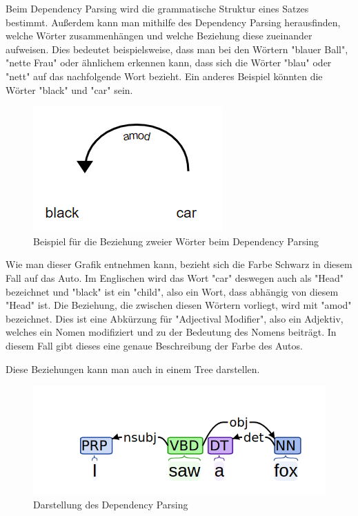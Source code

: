 Beim Dependency Parsing wird die grammatische Struktur eines Satzes bestimmt.
Außerdem kann man mithilfe des Dependency Parsing herausfinden, welche Wörter zusammenhängen und welche Beziehung diese zueinander aufweisen.
Dies bedeutet beispielsweise, dass man bei den Wörtern "blauer Ball", "nette Frau" oder ähnlichem erkennen kann, dass sich die Wörter "blau" oder "nett" auf das nachfolgende Wort bezieht.
Ein anderes Beispiel könnten die Wörter "black" und "car" sein.

\begin{figure}[hbt!]
    \centering
    \includegraphics[scale=1]{pics/dependency_parsing}
    \caption{Beispiel für die Beziehung zweier Wörter beim Dependency Parsing~\cite{dependencyParsing}}
    \label{fig:dependency_parsing_relation}
\end{figure}

Wie man dieser Grafik entnehmen kann, bezieht sich die Farbe Schwarz in diesem Fall auf das Auto.
Im Englischen wird das Wort "car" deswegen auch als "Head" bezeichnet und "black" ist ein "child", also ein Wort, dass abhängig von diesem "Head" ist.
Die Beziehung, die zwischen diesen Wörtern vorliegt, wird mit "amod" bezeichnet.
Dies ist eine Abkürzung für "Adjectival Modifier", also ein Adjektiv, welches ein Nomen modifiziert und zu der Bedeutung des Nomens beiträgt.
In diesem Fall gibt dieses eine genaue Beschreibung der Farbe des Autos.\cite{dependencyParsing}

Diese Beziehungen kann man auch in einem Tree darstellen.

\begin{figure}[hbt!]
    \centering
    \includegraphics[scale=0.5]{pics/dependency_parse_tree}
    \caption{Darstellung des Dependency Parsing~\cite{dependencyVsConstituencyParsing}}
    \label{fig:dependency_parsing_tree}
\end{figure}

